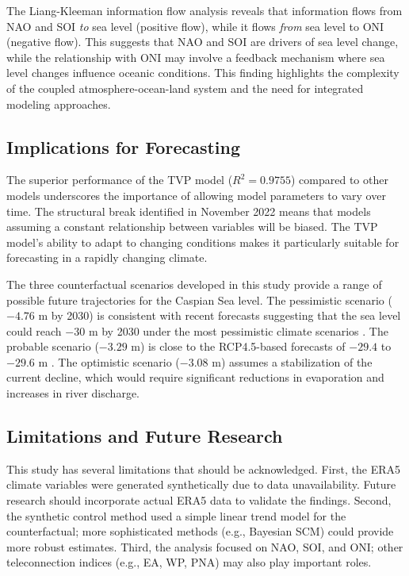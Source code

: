 \documentclass[12pt,a4paper,twocolumn]{article}
\begin{document}
The Liang-Kleeman information flow analysis reveals that information flows from NAO and SOI \emph{to} sea level (positive flow), while it flows \emph{from} sea level to ONI (negative flow). This suggests that NAO and SOI are drivers of sea level change, while the relationship with ONI may involve a feedback mechanism where sea level changes influence oceanic conditions. This finding highlights the complexity of the coupled atmosphere-ocean-land system and the need for integrated modeling approaches.

\subsection{Implications for Forecasting}

The superior performance of the TVP model ($R^2 = 0.9755$) compared to other models underscores the importance of allowing model parameters to vary over time. The structural break identified in November 2022 means that models assuming a constant relationship between variables will be biased. The TVP model's ability to adapt to changing conditions makes it particularly suitable for forecasting in a rapidly changing climate.

The three counterfactual scenarios developed in this study provide a range of possible future trajectories for the Caspian Sea level. The pessimistic scenario ($-4.76$ m by 2030) is consistent with recent forecasts suggesting that the sea level could reach $-30$ m by 2030 under the most pessimistic climate scenarios \citep{tengrinews2026, gazeta2026}. The probable scenario ($-3.29$ m) is close to the RCP4.5-based forecasts of $-29.4$ to $-29.6$ m \citep{journal_kazhydromet}. The optimistic scenario ($-3.08$ m) assumes a stabilization of the current decline, which would require significant reductions in evaporation and increases in river discharge.

\subsection{Limitations and Future Research}

This study has several limitations that should be acknowledged. First, the ERA5 climate variables were generated synthetically due to data unavailability. Future research should incorporate actual ERA5 data to validate the findings. Second, the synthetic control method used a simple linear trend model for the counterfactual; more sophisticated methods (e.g., Bayesian SCM) could provide more robust estimates. Third, the analysis focused on NAO, SOI, and ONI; other teleconnection indices (e.g., EA, WP, PNA) may also play important roles.
\end{document}

